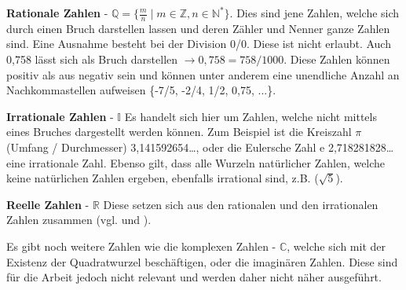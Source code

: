 \documentclass[12pt,a4paper]{article}
\theoremstyle{definition}
\begin{document}
\textbf{Rationale Zahlen} - $\mathbb{Q} = \{\frac{m}{n} \mid m \in \mathbb{Z}, n \in \mathbb{N}^*\}$.\newline
Dies sind jene Zahlen, welche sich durch einen Bruch darstellen lassen und deren Zähler und Nenner ganze Zahlen sind.
Eine Ausnahme besteht bei der Division 0/0.
Diese ist nicht erlaubt.
Auch 0,758 lässt sich als Bruch darstellen $\rightarrow{0,758 = 758/1000}$.
Diese Zahlen können positiv als aus negativ sein und können unter anderem eine unendliche Anzahl an Nachkommastellen aufweisen \{-7/5, -2/4, 1/2, 0,75, ...\}.

\textbf{Irrationale Zahlen} - $\mathbb{I}$\newline
Es handelt sich hier um Zahlen, welche nicht mittels eines Bruches dargestellt werden können.
Zum Beispiel ist die Kreiszahl $\pi$ (Umfang / Durchmesser) 3,141592654…, oder die Eulersche Zahl $\mathrm{e}$ 2,718281828… eine irrationale Zahl.
Ebenso gilt, dass alle Wurzeln natürlicher Zahlen, welche keine natürlichen Zahlen ergeben, ebenfalls irrational sind, z.B. ($\sqrt{5}$).

\textbf{Reelle Zahlen} - $\mathbb{R}$\newline
Diese setzen sich aus den rationalen und den irrationalen Zahlen zusammen (vgl. \cite[7--9]{Engel2017} und \cite[5--6]{Houston2012}).

Es gibt noch weitere Zahlen wie die komplexen Zahlen - $\mathbb{C}$, welche sich mit der Existenz der Quadratwurzel beschäftigen, oder die  imaginären Zahlen.
Diese sind für die Arbeit jedoch nicht relevant und werden daher nicht näher ausgeführt.
\end{document}
